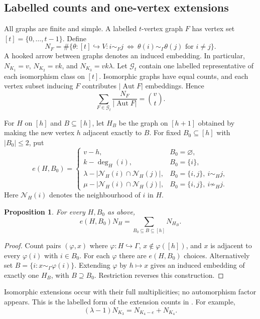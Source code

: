 \documentclass[11pt]{article}
\newtheorem{proposition}[theorem]{Proposition}
\theoremstyle{remark}
\DeclareMathOperator{\Aut}{Aut}
\numberwithin{equation}{section}
\begin{document}
\subsection{Labelled counts and one-vertex extensions}\label{subsec:counts}
All graphs are finite and simple. A labelled $t$-vertex graph $F$ has
vertex set $[t]=\{0,\ldots,t-1\}$. Define
\begin{equation}\label{eq:NF}
 N_F=\#\{\theta:[t]\hookrightarrow V:
 i\sim_Fj\ \Longleftrightarrow\ \theta(i)\sim_\Gamma\theta(j)
 \text{ for }i\ne j\}.
\end{equation}
A hooked arrow between graphs denotes an induced embedding. In particular,
$N_{K_1}=v$, $N_{K_2}=vk$, and $N_{K_3}=vk\lambda$.
Let $\mathcal G_t$ contain one labelled representative of each isomorphism
class on $[t]$. Isomorphic graphs have equal counts, and each vertex subset
inducing $F$ contributes $|\Aut F|$ embeddings. Hence
\begin{equation}\label{eq:totals}
 \sum_{F\in\mathcal G_t}\frac{N_F}{|\Aut F|}=\binom vt.
\end{equation}

For $H$ on $[h]$ and $B\subseteq[h]$, let $H_B$ be the graph on
$[h+1]$ obtained by making the new vertex $h$ adjacent exactly to $B$.
For fixed $B_0\subseteq[h]$ with $|B_0|\le2$, put
\begin{equation}\label{eq:extensionfactor}
 e(H,B_0)=\begin{cases}
 v-h,&B_0=\varnothing,\\
 k-\deg_H(i),&B_0=\{i\},\\
 \lambda-|\mathcal N_H(i)\cap \mathcal N_H(j)|,&B_0=\{i,j\},\ i\sim_Hj,\\
 \mu-|\mathcal N_H(i)\cap \mathcal N_H(j)|,&B_0=\{i,j\},\ i\not\sim_Hj.
 \end{cases}
\end{equation}
Here $\mathcal N_H(i)$ denotes the neighbourhood of $i$ in $H$.
\begin{proposition}\label{prop:extensions}
For every $H,B_0$ as above,
\begin{equation}\label{eq:extensions}
 e(H,B_0)N_H=\sum_{B_0\subseteq B\subseteq[h]}N_{H_B}.
\end{equation}
\end{proposition}
\begin{proof}
Count pairs $(\varphi,x)$ where $\varphi:H\hookrightarrow\Gamma$,
$x\notin\varphi([h])$, and $x$ is adjacent to every $\varphi(i)$
with $i\in B_0$. For each $\varphi$ there are $e(H,B_0)$ choices.
Alternatively set $B=\{i:x\sim_\Gamma\varphi(i)\}$. Extending
$\varphi$ by $h\mapsto x$ gives an induced embedding of exactly one
$H_B$, with $B\supseteq B_0$. Restriction reverses this construction.
\end{proof}
Isomorphic extensions occur with their full multiplicities; no automorphism
factor appears. This is the labelled form of the extension counts in
\cite[Proposition~3.2(i)--(iv)]{kovacikova}. For example,
\[
 (\lambda-1)N_{K_3}=N_{K_4-e}+N_{K_4}.
\]
\end{document}
